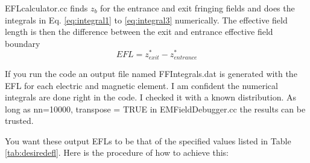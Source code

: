 \documentclass[letter,11pt]{article}
\newcommand{\filefont}[1]{{\scriptsize\ttfamily\selectfont #1}\xspace}
\begin{document}
EFLcalculator.cc finds $z_{b}$ for the entrance and exit fringing fields and does the integrals in Eq. \ref{eq:integral1} to \ref{eq:integral3} numerically. The effective field length is then the difference between the exit and entrance effective field boundary
\begin{equation}
EFL=z^{*}_{exit}-z^{*}_{entrance}
\end{equation}

If you run the code an output file named FFIntegrals.dat is generated with the EFL for each electric and magnetic element. I am confident the numerical integrals are done right in the code. I checked it with a known distribution. As long as \filefont{nn=10000}, \filefont{transpose = TRUE} in EMFieldDebugger.cc the results can be trusted.

You want these output EFLs to be that of the specified values listed in Table \ref{tab:desiredefl}. Here is the procedure of how to achieve this:
\end{document}
